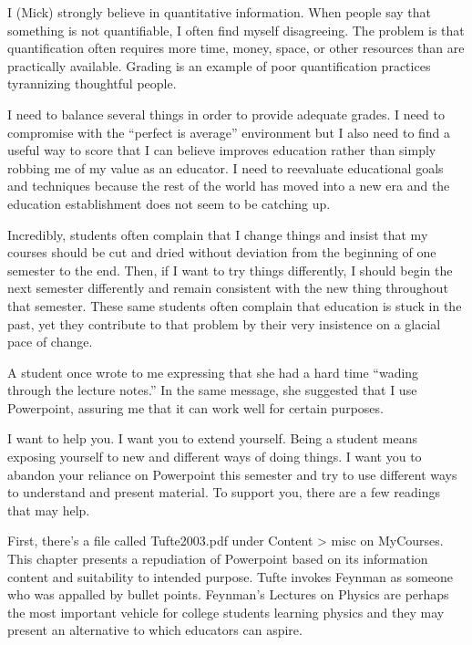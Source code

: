 I (Mick) strongly believe in quantitative information. When people say
that something is not quantifiable, I often find myself disagreeing. The
problem is that quantification often requires more time, money, space,
or other resources than are practically available. Grading is an example
of poor quantification practices tyrannizing thoughtful people.

I need to balance several things in order to provide adequate grades. I
need to compromise with the ``perfect is average'' environment but I
also need to find a useful way to score that I can believe improves
education rather than simply robbing me of my value as an educator. I
need to reevaluate educational goals and techniques because the rest of
the world has moved into a new era and the education establishment does
not seem to be catching up.

Incredibly, students often complain that I change things and insist that
my courses should be cut and dried without deviation from the beginning
of one semester to the end. Then, if I want to try things differently, I
should begin the next semester differently and remain consistent with
the new thing throughout that semester. These same students often
complain that education is stuck in the past, yet they contribute to
that problem by their very insistence on a glacial pace of change.

\hypertarget{powerlesspoint}{%
\label{powerlesspoint}}

A student once wrote to me expressing that she had a hard time ``wading
through the lecture notes.'' In the same message, she suggested that I
use Powerpoint, assuring me that it can work well for certain purposes.

I want to help you. I want you to extend yourself. Being a student means
exposing yourself to new and different ways of doing things. I want you
to abandon your reliance on Powerpoint this semester and try to use
different ways to understand and present material. To support you, there
are a few readings that may help.

First, there's a file called Tufte2003.pdf under Content \textgreater{}
misc on MyCourses. This chapter presents a repudiation of Powerpoint
based on its information content and suitability to intended purpose.
Tufte invokes Feynman as someone who was appalled by bullet points.
Feynman's Lectures on Physics are perhaps the most important vehicle for
college students learning physics and they may present an alternative to
which educators can aspire.

